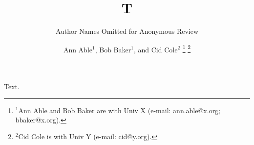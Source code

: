 \documentclass[conference]{IEEEtran}
\author{Author Names Omitted for Anonymous Review}
\author{Ann Able$^{1}$, Bob Baker$^{1}$, and Cid Cole$^{2}$%
\thanks{$^{1}$Ann Able and Bob Baker are with Univ X (e-mail: ann.able@x.org; bbaker@x.org).}
\thanks{$^{2}$Cid Cole is with Univ Y (e-mail: cid@y.org).}}
\begin{document}
\title{T}
\maketitle
Text.
\end{document}
